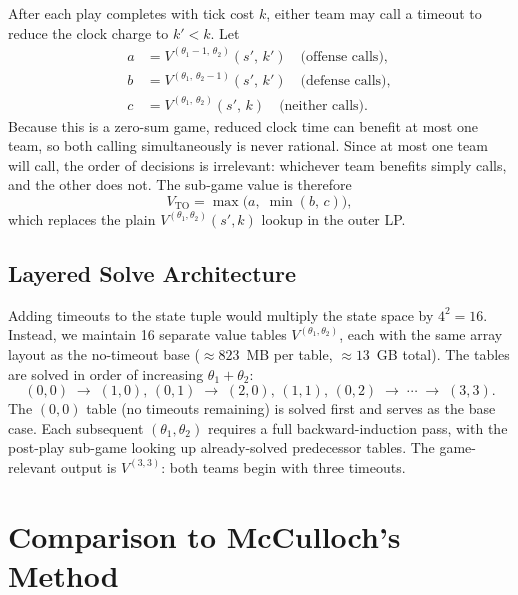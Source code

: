 \documentclass[11pt,letterpaper]{article}
\begin{document}
After each play completes with tick cost $k$, either team may call a timeout to reduce
the clock charge to $k' < k$.  Let
\begin{align*}
  a &= V^{(\theta_1-1,\,\theta_2)}(s',\,k')   \quad \text{(offense calls)},\\
  b &= V^{(\theta_1,\,\theta_2-1)}(s',\,k')   \quad \text{(defense calls)},\\
  c &= V^{(\theta_1,\,\theta_2)}(s',\,k)       \quad \text{(neither calls)}.
\end{align*}
Because this is a zero-sum game, reduced clock time can benefit at most one team, so
both calling simultaneously is never rational.  Since at most one team will call, the
order of decisions is irrelevant: whichever team benefits simply calls, and the other
does not.  The sub-game value is therefore
\begin{equation}
  \label{eq:to_subgame}
  V_{\text{TO}} = \max\!\bigl(a,\;\min(b,\,c)\bigr),
\end{equation}
which replaces the plain $V^{(\theta_1,\theta_2)}(s',k)$ lookup in the outer LP.

\subsection{Layered Solve Architecture}

Adding timeouts to the state tuple would multiply the state space by $4^2 = 16$.
Instead, we maintain 16 separate value tables $V^{(\theta_1,\theta_2)}$, each with the
same array layout as the no-timeout base ($\approx 823$~MB per table, $\approx 13$~GB
total).  The tables are solved in order of increasing $\theta_1 + \theta_2$:
\[
  (0,0) \;\to\; (1,0),\,(0,1) \;\to\; (2,0),\,(1,1),\,(0,2) \;\to\; \cdots \;\to\; (3,3).
\]
The $(0,0)$ table (no timeouts remaining) is solved first and serves as the base case.
Each subsequent $(\theta_1,\theta_2)$ requires a full backward-induction pass, with the
post-play sub-game looking up already-solved predecessor tables.  The game-relevant
output is $V^{(3,3)}$: both teams begin with three timeouts.

\section{Comparison to McCulloch's Method}
\label{sec:comparison}
\end{document}
